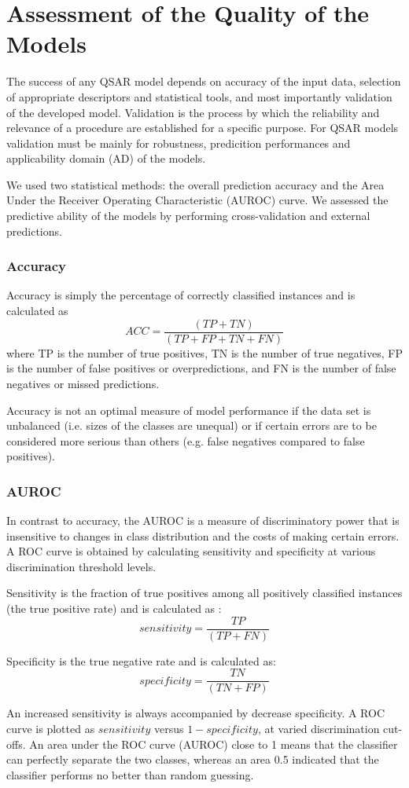 \section*{Assessment of the Quality of the Models}

The success of any QSAR model depends on accuracy of the input data, selection of appropriate descriptors and statistical tools, and most importantly validation of the developed model. Validation is the process by which the reliability and relevance of a procedure are established for a specific purpose. For QSAR models validation must be mainly for robustness, predicition performances and applicability domain (AD) of the models. \cite{Lapins2013}

We used two statistical methods: the overall prediction accuracy and the Area Under the Receiver Operating Characteristic (AUROC) curve. We assessed the predictive ability of the models by performing cross-validation and external predictions.

\subsubsection{Accuracy}

Accuracy is simply the percentage of correctly classified instances and is calculated as
$$ ACC =\frac{(TP + TN)}{(TP + FP + TN + FN)} $$
where TP is the number of true positives, TN is the number of true negatives, FP is the number of false positives or over­predictions, and FN is the number of false negatives or missed predictions.\cite{Lapins2013}

Accuracy is not an optimal measure of model performance if the data set is unbalanced (i.e. sizes of the classes are unequal) or if certain errors are to be considered more serious than others (e.g. false negatives compared to false positives).\cite{Lapins2013}

\subsubsection{AUROC}
In contrast to accuracy, the AUROC is a measure of discriminatory power that is insensitive to changes in class distribution and the costs of making certain errors. A ROC curve is obtained by calculating sensitivity and specificity at various discrimination threshold levels.

Sensitivity is the fraction of true positives among all positively classified instances (the true positive rate) and is calculated as : 
$$ sensitivity = \frac{TP}{(TP + FN)} $$

Specificity is the true negative rate and is calculated as:
$$ specificity =\frac{ TN }{(TN + FP)} $$

An increased sensitivity is always accompanied by decrease specificity. A ROC curve is plotted as $sensitivity$ versus $1-specificity$, at varied discrimination cut-offs. An area under the ROC curve (AUROC) close to 1 means that the classifier can perfectly separate the two classes, whereas an area 0.5 indicated that the classifier performs no better than random guessing.\cite{Lapins2013}
